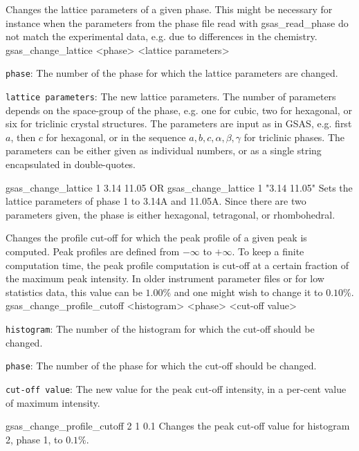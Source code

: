 {
Changes the lattice parameters of a given phase. This might be necessary for instance when the parameters from the phase file read with gsas\_read\_phase do not match the experimental data, e.g. due to differences in the chemistry.
}{
gsas\_change\_lattice <phase> <lattice parameters>
}{
\item \texttt{phase}: The number of the phase for which the lattice parameters are changed.
\item \texttt{lattice parameters}: The new lattice parameters. The number of parameters depends on the space-group of the phase, e.g. one for cubic, two for hexagonal, or six for triclinic crystal structures. The parameters are input as in GSAS, e.g. first $a$, then $c$ for hexagonal, or in the sequence $a, b, c, \alpha, \beta, \gamma$ for triclinic phases. The parameters can be either given as individual numbers, or as a single string encapsulated in double-quotes.
}{
gsas\_change\_lattice 1 3.14 11.05 OR
gsas\_change\_lattice 1 "3.14 11.05"
}{
Sets the lattice parameters of phase 1 to 3.14A and 11.05A. Since there are two parameters given, the phase is either hexagonal, tetragonal, or rhombohedral.
}

{
Changes the profile cut-off for which the peak profile of a given peak is computed. Peak profiles are defined from $-\infty$ to $+\infty$. To keep a finite computation time, the peak profile computation is cut-off at a certain fraction of the maximum peak intensity. In older instrument parameter files or for low statistics data, this value can be $1.00\%$ and one might wish to change it to $0.10\%$.
}{
gsas\_change\_profile\_cutoff <histogram> <phase> <cut-off value>
}{
\item \texttt{histogram}: The number of the histogram for which the cut-off should be changed.
\item \texttt{phase}: The number of the phase for which the cut-off should be changed.
\item \texttt{cut-off value}: The new value for the peak cut-off intensity, in a per-cent value of maximum intensity.
}{
gsas\_change\_profile\_cutoff 2 1 0.1
}{
Changes the peak cut-off value for histogram 2, phase 1, to $0.1\%$.
}


